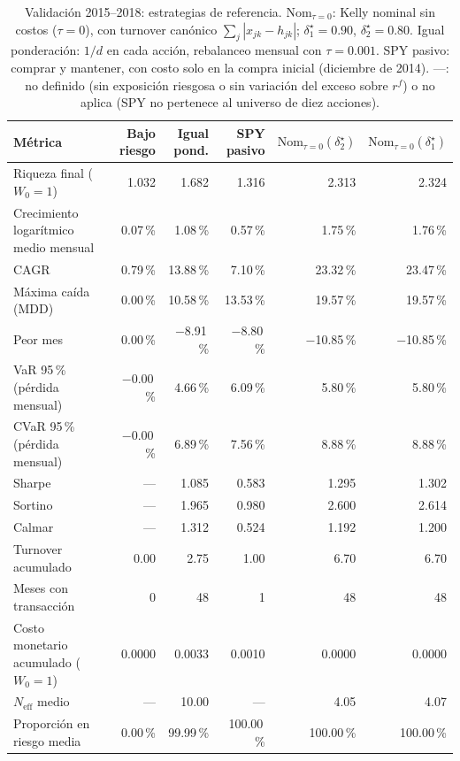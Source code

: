 \begin{table}[h]
\centering
\footnotesize
\setlength{\tabcolsep}{4pt}
\caption{Validación 2015--2018: estrategias de referencia. $\mathrm{Nom}_{\tau=0}$: Kelly nominal sin costos ($\tau=0$), con turnover canónico $\sum_j|x_{jk}-h_{jk}|$; $\delta_1^\star=0.90$, $\delta_2^\star=0.80$. Igual ponderación: $1/d$ en cada acción, rebalanceo mensual con $\tau=0.001$. SPY pasivo: comprar y mantener, con costo solo en la compra inicial (diciembre de 2014). ---: no definido (sin exposición riesgosa o sin variación del exceso sobre $r^f$) o no aplica (SPY no pertenece al universo de diez acciones).}\label{tab:r2_f}
\begin{tabular}{|l|r|r|r|r|r|}
\hline
\textbf{Métrica} & \textbf{Bajo riesgo} & \textbf{Igual pond.} & \textbf{SPY pasivo} & \textbf{$\mathrm{Nom}_{\tau=0}(\delta_2^\star)$} & \textbf{$\mathrm{Nom}_{\tau=0}(\delta_1^\star)$} \\ \hline
Riqueza final ($W_0=1$) & 1.032 & 1.682 & 1.316 & 2.313 & 2.324 \\ \hline
Crecimiento logarítmico medio mensual & 0.07\,\% & 1.08\,\% & 0.57\,\% & 1.75\,\% & 1.76\,\% \\ \hline
CAGR & 0.79\,\% & 13.88\,\% & 7.10\,\% & 23.32\,\% & 23.47\,\% \\ \hline
Máxima caída (MDD) & 0.00\,\% & 10.58\,\% & 13.53\,\% & 19.57\,\% & 19.57\,\% \\ \hline
Peor mes & 0.00\,\% & $-$8.91\,\% & $-$8.80\,\% & $-$10.85\,\% & $-$10.85\,\% \\ \hline
VaR 95\,\% (pérdida mensual) & $-$0.00\,\% & 4.66\,\% & 6.09\,\% & 5.80\,\% & 5.80\,\% \\ \hline
CVaR 95\,\% (pérdida mensual) & $-$0.00\,\% & 6.89\,\% & 7.56\,\% & 8.88\,\% & 8.88\,\% \\ \hline
Sharpe & --- & 1.085 & 0.583 & 1.295 & 1.302 \\ \hline
Sortino & --- & 1.965 & 0.980 & 2.600 & 2.614 \\ \hline
Calmar & --- & 1.312 & 0.524 & 1.192 & 1.200 \\ \hline
Turnover acumulado & 0.00 & 2.75 & 1.00 & 6.70 & 6.70 \\ \hline
Meses con transacción & 0 & 48 & 1 & 48 & 48 \\ \hline
Costo monetario acumulado ($W_0=1$) & 0.0000 & 0.0033 & 0.0010 & 0.0000 & 0.0000 \\ \hline
$N_{\mathrm{eff}}$ medio & --- & 10.00 & --- & 4.05 & 4.07 \\ \hline
Proporción en riesgo media & 0.00\,\% & 99.99\,\% & 100.00\,\% & 100.00\,\% & 100.00\,\% \\ \hline
\end{tabular}
\end{table}
